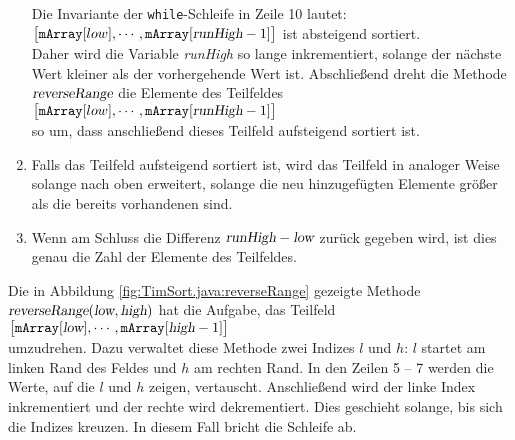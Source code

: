 \begin{enumerate}
      Die Invariante der \texttt{while}-Schleife in Zeile 10 lautet:
      \\[0.2cm]
      \hspace*{1.3cm}
      $\bigl[ \mathtt{mArray}[low], \cdots, \mathtt{mArray}[\textsl{runHigh}-1] \bigr]$
      ist absteigend sortiert.  
      \\[0.2cm]
      Daher wird die Variable \textsl{runHigh} so lange inkrementiert, solange der n\"achste Wert
      kleiner als der vorhergehende Wert ist.  Abschlie{\ss}end dreht die Methode
      $\textsl{reverseRange}$
      die Elemente des Teilfeldes
      \\[0.2cm]
      \hspace*{1.3cm}
      $\bigl[ \mathtt{mArray}[low], \cdots, \mathtt{mArray}[\textsl{runHigh}-1] \bigr]$
      \\[0.2cm]
      so um, dass anschlie{\ss}end dieses Teilfeld aufsteigend sortiert ist. 
\item Falls das Teilfeld aufsteigend sortiert ist, wird das Teilfeld in analoger Weise solange nach
      oben erweitert, solange die neu hinzugef\"ugten Elemente gr\"o{\ss}er als die bereits vorhandenen sind.
\item Wenn am Schluss die Differenz $\textsl{runHigh} - \textsl{low}$ zur\"uck gegeben wird, ist dies
      genau die Zahl der Elemente des Teilfeldes.
\end{enumerate}

\noindent
Die in Abbildung \ref{fig:TimSort.java:reverseRange} gezeigte Methode
$\textsl{reverseRange}(\textsl{low}, \textsl{high})$ hat die Aufgabe, das Teilfeld
\\[0.2cm]
\hspace*{1.3cm}
$\bigl[ \mathtt{mArray}[\textsl{low}], \cdots, \mathtt{mArray}[\textsl{high}-1] \bigr]$
\\[0.2cm]
umzudrehen.  Dazu verwaltet diese Methode zwei Indizes $l$ und $h$: $l$ startet am linken Rand des
Feldes und $h$ am rechten Rand.  In den Zeilen 5 -- 7 werden die Werte, auf die $l$ und $h$ zeigen,
vertauscht.  Anschlie{\ss}end wird der linke Index inkrementiert und der rechte wird dekrementiert.
Dies geschieht solange, bis sich die Indizes kreuzen.  In diesem Fall bricht die Schleife ab.



